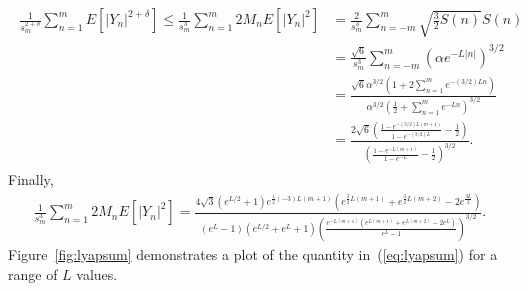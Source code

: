 \begin{align*}
\begin{split}
\frac{1}{s_m^{2+\delta}}\sum_{n=1}^mE[|Y_n|^{2+\delta}] \leq
\frac{1}{s_m^{3}}\sum_{n=1}^m2M_nE[|Y_n|^{2}]
&=\frac{2}{s_m^{3}}\sum_{n=-m}^m\sqrt{\frac{3}{2}S(n)}S(n)\\
&=\frac{\sqrt{6}}{s_m^{3}}\sum_{n=-m}^m(\alpha e^{-L|n|})^{3/2}\\
&=\frac{\sqrt{6}\alpha^{3/2}\left(1+2\sum_{n=1}^{m}e^{-(3/2)Ln}\right)}{\alpha^{3/2}(\frac{1}{2} +\sum_{n=1}^m e^{-Ln})^{3/2}}\\
&=\frac{2\sqrt{6}\left(\frac{1-e^{-(3/2)L(m+1)}}{1-e^{-(3/2)L}}-\frac{1}{2}\right)}{(\frac{1-e^{-L(m+1)}}{1-e^{-L}}-\frac{1}{2})^{3/2}}.
\end{split}
\end{align*}
Finally,
\begin{align}\label{eq:lyapsum}
\frac{1}{s_m^{3}}\sum_{n=1}^m2M_nE[|Y_n|^{2}]=\frac{4 \sqrt{3} \left(e^{L/2}+1\right) e^{\frac{1}{2} (-3) L (m+1)} \left(e^{\frac{3}{2} L (m+1)}+e^{\frac{3}{2} L (m+2)}-2 e^{\frac{3 L}{2}}\right)}{\left(e^L-1\right) \left(e^{L/2}+e^L+1\right) \left(\frac{e^{-L (m+1)} \left(e^{L (m+1)}+e^{L (m+2)}-2 e^L\right)}{e^L-1}\right)^{3/2}}.
\end{align}
Figure~\ref{fig:lyapsum} demonstrates a plot of the quantity
in~(\ref{eq:lyapsum}) for a range of $L$ values.
